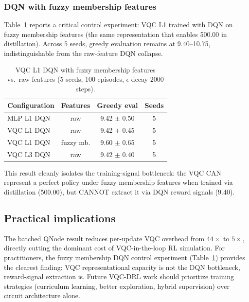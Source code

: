 \subsubsection*{DQN with fuzzy membership features}

Table~\ref{tab:dqn-fuzzy} reports a critical control experiment: VQC L1 trained
with DQN on fuzzy membership features (the same representation that enables
500.00 in distillation). Across 5 seeds, greedy evaluation remains at
9.40--10.75, indistinguishable from the raw-feature DQN collapse.

\begin{table}[t]
  \centering
  \caption{VQC L1 DQN with fuzzy membership features vs.\ raw features (5 seeds, 100 episodes, $\epsilon$ decay 2000 steps).}
  \label{tab:dqn-fuzzy}
  \begin{tabular}{lccc}
    \hline
    Configuration & Features & Greedy eval & Seeds \\
    \hline
    MLP L1 DQN & raw & 9.42 $\pm$ 0.50 & 5 \\
    VQC L1 DQN & raw & 9.42 $\pm$ 0.45 & 5 \\
    VQC L1 DQN & fuzzy mb. & 9.60 $\pm$ 0.65 & 5 \\
    VQC L3 DQN & raw & 9.42 $\pm$ 0.40 & 5 \\
    \hline
  \end{tabular}
\end{table}

This result cleanly isolates the training-signal bottleneck: the VQC CAN
represent a perfect policy under fuzzy membership features when trained via
distillation (500.00), but CANNOT extract it via DQN reward signals (9.40).

\subsection*{Practical implications}

The batched QNode result reduces per-update VQC overhead from $44\times$ to
$5\times$, directly cutting the dominant cost of VQC-in-the-loop RL simulation.
For practitioners, the fuzzy membership DQN control experiment (Table~\ref{tab:dqn-fuzzy})
provides the clearest finding: VQC representational capacity is not the DQN
bottleneck, reward-signal extraction is. Future VQC-DRL work should prioritize
training strategies (curriculum learning, better exploration, hybrid
supervision) over circuit architecture alone.

